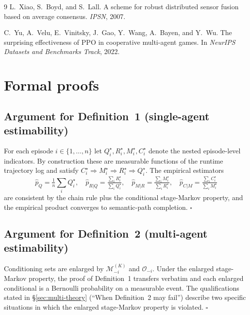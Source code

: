 \documentclass{article}
\begin{document}
{\begin{thebibliography}{9}
L.~Xiao, S.~Boyd, and S.~Lall.
\newblock A scheme for robust distributed sensor fusion based on average consensus.
\newblock \emph{IPSN}, 2007.

C.~Yu, A.~Velu, E.~Vinitsky, J.~Gao, Y.~Wang, A.~Bayen, and Y.~Wu.
\newblock The surprising effectiveness of PPO in cooperative multi-agent games.
\newblock In \emph{NeurIPS Datasets and Benchmarks Track}, 2022.

\end{thebibliography}
}

\appendix

\section{Formal proofs}
\label{app:proofs}

\subsection{Argument for Definition~1 (single-agent estimability)}

For each episode $i \in \{1,\dots,n\}$ let $Q_i^\star, R_i^\star, M_i^\star, C_i^\star$ denote the nested episode-level indicators. By construction these are measurable functions of the runtime trajectory log and satisfy $C_i^\star \Rightarrow M_i^\star \Rightarrow R_i^\star \Rightarrow Q_i^\star$. The empirical estimators
\[
\hat p_Q = \tfrac{1}{n}\sum_i Q_i^\star,\quad
\hat p_{R|Q} = \tfrac{\sum_i R_i^\star}{\sum_i Q_i^\star},\quad
\hat p_{M|R} = \tfrac{\sum_i M_i^\star}{\sum_i R_i^\star},\quad
\hat p_{C|M} = \tfrac{\sum_i C_i^\star}{\sum_i M_i^\star}
\]
are consistent by the chain rule plus the conditional stage-Markov property, and the empirical product converges to semantic-path completion. \hfill$\square$

\subsection{Argument for Definition~2 (multi-agent estimability)}

Conditioning sets are enlarged by $\mathcal{M}_{-i}^{(K)}$ and $\mathcal{O}_{-i}$. Under the enlarged stage-Markov property, the proof of Definition~1 transfers verbatim and each enlarged conditional is a Bernoulli probability on a measurable event. The qualifications stated in \S\ref{sec:multi-theory} (``When Definition~2 may fail'') describe two specific situations in which the enlarged stage-Markov property is violated. \hfill$\square$
\end{document}
